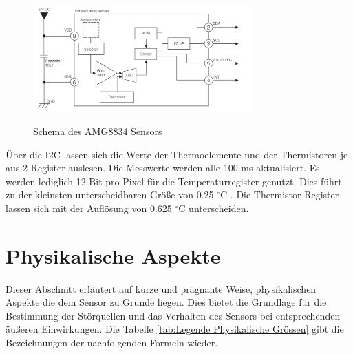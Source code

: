 \begin{figure}[H]
	\centering
	\includegraphics[width=0.75\textwidth]
	{fig/Circuit_AMG8834.PNG}
	\caption[Schema des AMG8834 Sensors]{Schema des AMG8834 Sensors} \protect\cite{AMG8834}
	\label{fig:SchemaAMG8834}
\end{figure}
 
Über die \ac{I2C} lassen sich die Werte der Thermoelemente und der Thermistoren je aus 2 Register auslesen. Die Messwerte werden alle 100 ms aktualisiert. Es werden lediglich 12 Bit pro Pixel für die Temperaturregister genutzt. Dies führt zu der kleinsten unterscheidbaren Größe von 0.25 $^\circ$C . Die Thermistor-Register lassen sich mit der Auflösung von 0.625 $^\circ$C unterscheiden. 

\section{Physikalische Aspekte}
Dieser Abschnitt erläutert auf kurze und prägnante Weise, physikalischen Aspekte die dem Sensor zu Grunde liegen. Dies bietet die Grundlage für die Bestimmung der Störquellen und das Verhalten des Sensors bei entsprechenden äußeren Einwirkungen. Die Tabelle \ref{tab:Legende Physikalische Grössen} gibt die Bezeichnungen der nachfolgenden Formeln wieder.

